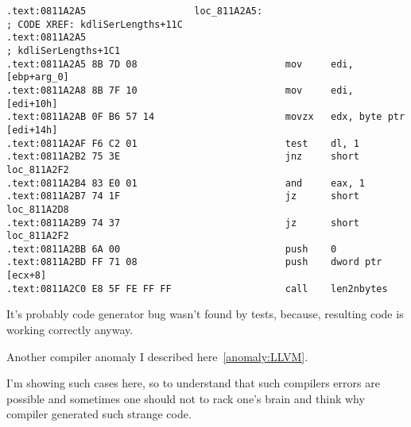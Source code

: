 \documentclass[11pt,a4paper,oneside]{book}
\begin{document}
\begin{lstlisting}[caption=\IFRU{оттуда же}{from the same code}]
.text:0811A2A5                   loc_811A2A5:                            ; CODE XREF: kdliSerLengths+11C
.text:0811A2A5                                                           ; kdliSerLengths+1C1
.text:0811A2A5 8B 7D 08                          mov     edi, [ebp+arg_0]
.text:0811A2A8 8B 7F 10                          mov     edi, [edi+10h]
.text:0811A2AB 0F B6 57 14                       movzx   edx, byte ptr [edi+14h]
.text:0811A2AF F6 C2 01                          test    dl, 1
.text:0811A2B2 75 3E                             jnz     short loc_811A2F2
.text:0811A2B4 83 E0 01                          and     eax, 1
.text:0811A2B7 74 1F                             jz      short loc_811A2D8
.text:0811A2B9 74 37                             jz      short loc_811A2F2
.text:0811A2BB 6A 00                             push    0
.text:0811A2BD FF 71 08                          push    dword ptr [ecx+8]
.text:0811A2C0 E8 5F FE FF FF                    call    len2nbytes
\end{lstlisting}

{It's probably code generator bug wasn't found by tests, because, 
resulting code is working correctly anyway.}

{Another compiler anomaly I described here}~\ref{anomaly:LLVM}.

{I'm showing such cases here, so to understand that such compilers errors are possible and sometimes
one should not to rack one's brain and think why compiler generated such strange code.}










\clearpage
\printindex
\end{document}
